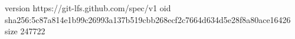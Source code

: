 version https://git-lfs.github.com/spec/v1
oid sha256:5c87a814e1b99c26993a137b519cbb268ecf2c7664d634d5e28f8a80ace16426
size 247722
